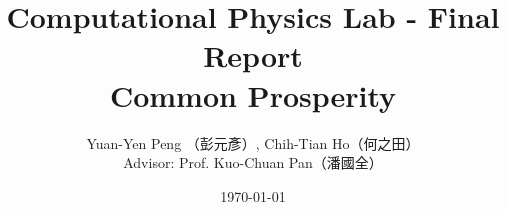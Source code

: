 \documentclass[10pt]{article}
\begin{document}
\pagestyle{fancy}
\fancyhf{} %
\renewcommand{\headrulewidth}{0pt} %
\fancyfoot[C]{\thepage}

\title{{\vspace{-2.5cm}
        \normalsize Computational Physics Lab - Final Report}\\
        \textbf{Common Prosperity}}
\author{Yuan-Yen Peng （彭元彥）, Chih-Tian Ho（何之田）\\
        Advisor: Prof. Kuo-Chuan Pan（潘國全）}
\date{\today}
\maketitle

\thispagestyle{fancy}
\end{document}
